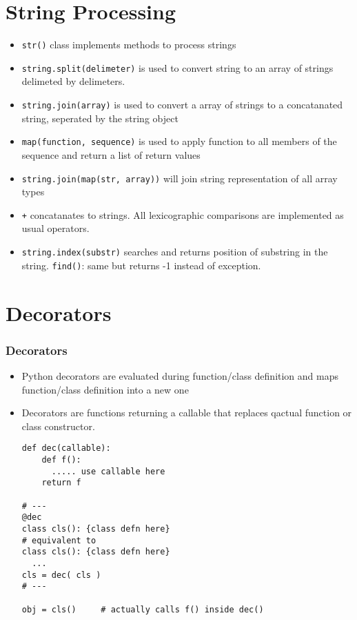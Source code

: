\documentclass[trans,compress,xcolor=table]{beamer}
\begin{document}
\section{String Processing}
\begin{frame}
\begin{itemize}
\frametitle{String Processing}
\item \lstinline!str()! class implements methods to process strings
\item \lstinline!string.split(delimeter)! is used to convert string to 
	an array of strings delimeted by delimeters.
\item \lstinline!string.join(array)! is used to convert a array of
strings to a concatanated string, seperated by the string object
\item \lstinline!map(function, sequence)! is used to apply function to
   all members of the sequence and return a list of return values
\item \lstinline!string.join(map(str, array))! will join string
	representation of all array types
\item \lstinline!+! concatanates to strings. All lexicographic
	comparisons are implemented as usual operators.
\item \lstinline!string.index(substr)! searches and returns position
	of substring in the string. \lstinline!find()!: same but
	returns -1 instead of exception.
\end{itemize}
\end{frame}


\section{Decorators}
\begin{frame}[fragile]
\frametitle{Decorators}
\begin{itemize}
\item Python decorators are evaluated during function/class definition
    and maps function/class definition into a new one
\item Decorators are functions returning a callable that replaces
    qactual function or class constructor.
\begin{lstlisting}[escapeinside=\{\}]
def dec(callable):
    def f():
      ..... use callable here
    return f

# ---
@dec
class cls(): {class defn here}
# equivalent to
class cls(): {class defn here}
  ...
cls = dec( cls )
# ---

obj = cls()     # actually calls f() inside dec()
\end{lstlisting}
\end{itemize}
\end{frame}
\end{document}
